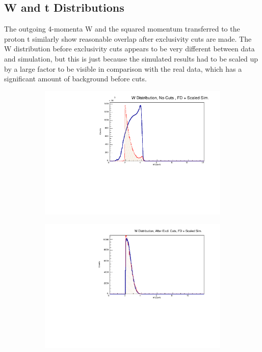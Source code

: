     \clearpage    
    \subsection{W and t Distributions}
    The outgoing 4-momenta W and the squared momentum transferred to the proton t similarly show reasonable overlap after exclusivity cuts are made. The W distribution before exclusivity cuts appears to be very different between data and simulation, but this is just because the simulated results had to be scaled up by a large factor to be visible in comparison with the real data, which has a significant amount of background before cuts.

        \begin{figure}[!htb]
            \centering
            \begin{subfigure}{.5\textwidth}
                \centering
                \includegraphics[width=1\textwidth]{figures/Simulation/kinematics_advanced/hist_w_nocut_fd_Double.pdf}
            \end{subfigure}%
            \begin{subfigure}{.5\textwidth}
                \centering
                \includegraphics[width=1\textwidth]{figures/Simulation/kinematics_advanced/hist_w_excut_fd_Double.pdf}

\end{subfigure}
\end{figure}
